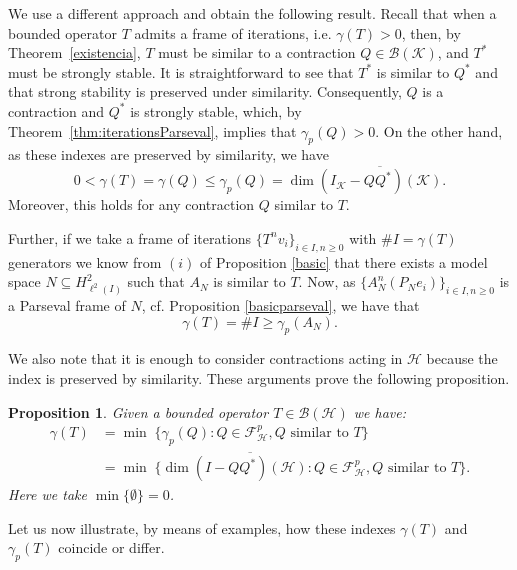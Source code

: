\documentclass[a4paper,12pt]{amsart}
\def\cB{{\mathcal{B}}}
\def\cF{{\mathcal{F}}}
\def\HH{{\mathcal{H}}}
\def\KK{{\mathcal{K}}}
\def\cF{{\mathcal{F}}}
\newtheorem{proposition}[theorem]{Proposition}
\theoremstyle{definition}
\begin{document}
We use a different approach and obtain the following result. Recall that when a bounded operator \(T\) admits a frame of iterations, i.e. \(\gamma(T) > 0\), then, by Theorem~\ref{existencia}, \(T\) must be similar to a contraction \(Q \in \cB(\KK)\), and \(T^*\) must be strongly stable. It is straightforward to see that \(T^*\) is similar to \(Q^*\) and that strong stability is preserved under similarity. Consequently, \(Q\) is a contraction and \(Q^*\) is strongly stable, which, by Theorem~\ref{thm:iterationsParseval}, implies that \(\gamma_p(Q) > 0\). On the other hand, as these indexes are preserved by similarity, we have
\begin{equation*}
0<\gamma(T)=\gamma(Q)\leqslant\gamma_p(Q)=\dim\overline{(I_{\KK}-QQ^*)(\KK)}.
\end{equation*}
Moreover, this holds for any contraction $Q$ similar to $T$.

Further, if we take a frame of iterations $\{T^nv_i\}_{i\in I,n\geqslant0}$ with $\#I=\gamma(T)$ generators we know from $(i)$ of Proposition \ref{basic} that there exists a model space $N\subseteq H^2_{\ell^2(I)}$ such that $A_N$ is similar to $T$. Now, as $\{A_N^n(P_Ne_i)\}_{i\in I,n\geqslant0}$ is a Parseval frame of $N$, cf. Proposition \ref{basicparseval}, we have that
\begin{equation*}
\gamma(T)=\#I\geqslant\gamma_p(A_N).
\end{equation*}

We also note that it is enough to consider contractions acting in $\HH$ because the index is preserved by similarity.
These arguments prove the following proposition.
\begin{proposition}\label{general index}
Given a bounded operator $T\in\cB(\HH)$ we have: 
\begin{align*}
\gamma(T) &=\min\;\{\gamma_p(Q) :Q\in\cF^{p}_\HH, Q\text{ similar to } T\}\\
&=\min\;\{\dim\overline{(I-QQ^*)(\HH)} :Q\in\cF^{p}_\HH, Q
\text{ similar to } T\}.
\end{align*}
Here we take $\min\{\emptyset\}=0$.
\end{proposition}
Let us now illustrate, by means of examples, how these indexes $\gamma(T)$ and $\gamma_p(T)$ coincide or differ.
\end{document}
